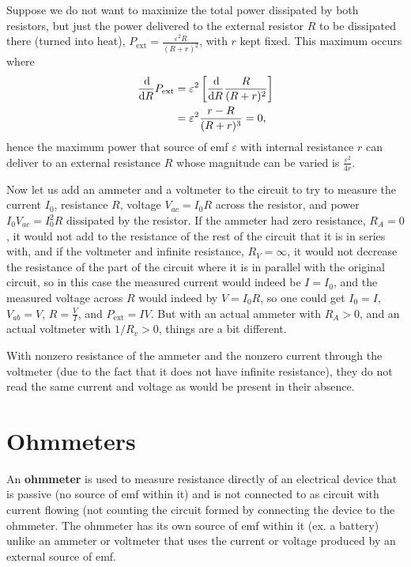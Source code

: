 Suppose we do not want to maximize the total power dissipated by both resistors, but just the power delivered to the external resistor $R$ to be dissipated there (turned into heat), $P_\text{ext} = \frac{\varepsilon^2R}{(R+r)^2}$, with $r$ kept fixed. This maximum occurs where 
\begin{align*}
\dfrac{\operatorname{d\!}}{\operatorname{d\!} R} P_\text{ext} &= \varepsilon^2 \left[  \dfrac{\operatorname{d\!}}{\operatorname{d\!} R} \dfrac{R}{(R+r)^2}  \right] \\
&= \varepsilon^2 \dfrac{r-R}{(R+r)^3} = 0,
\end{align*}
hence the maximum power that source of emf $\varepsilon$ with internal resistance $r$ can deliver to an external resistance $R$ whose magnitude can be varied is $\frac{\varepsilon^2}{4r}$.

Now let us add an ammeter and a voltmeter to the circuit to try to measure the current $I_0$, resistance $R$, voltage $V_{ac} = I_0R$ across the resistor, and power $I_0V_{ac} = I_0^2R$ dissipated by the resistor. If the ammeter had zero resistance, $R_A = 0$, it would not add to the resistance of the rest of the circuit that it is in series with, and if the voltmeter and infinite resistance, $R_V = \infty$, it would not decrease the resistance of the part of the circuit where it is in parallel with the original circuit, so in this case the measured current would indeed be $I=I_0$, and the measured voltage across $R$ would indeed by $V= I_0R$, so one could get $I_0 = I$, $V_{ab} = V$, $R = \frac{V}{I}$, and $P_\text{ext} = IV$. But with an actual ammeter with $R_A > 0$, and an actual voltmeter with $1/R_v > 0$, things are a bit different.

With nonzero resistance of the ammeter and the nonzero current through the voltmeter (due to the fact that it does not have infinite resistance), they do not read the same current and voltage as would be present in their absence. 

\section{Ohmmeters}

An \textbf{ohmmeter} is used to measure resistance directly of an electrical device that is passive (no source of emf within it) and is not connected to as circuit with current flowing (not counting the circuit formed by connecting the device to the ohmmeter. The ohmmeter has its own source of emf within it (ex. a battery) unlike an ammeter or voltmeter that uses the current or voltage produced by an external source of emf. 

